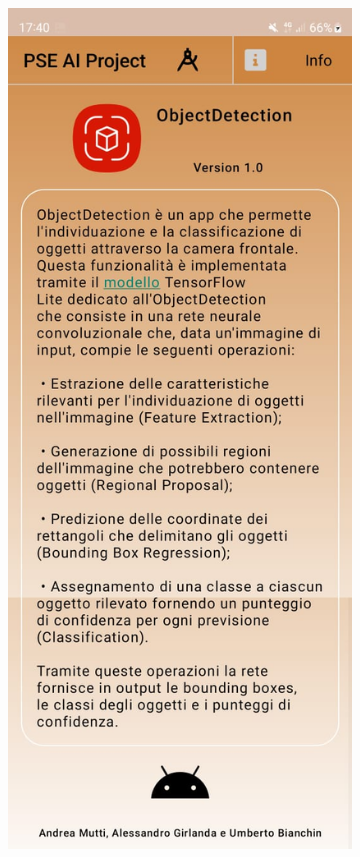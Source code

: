 \begin{figure}[ht]
    \centering
    \begin{subfigure}[b]{0.3\textwidth}
      \includegraphics[width=\textwidth, height=0.45\textheight]{Immagini/App/info_chiaro.jpeg}

\end{subfigure}
\end{figure}
